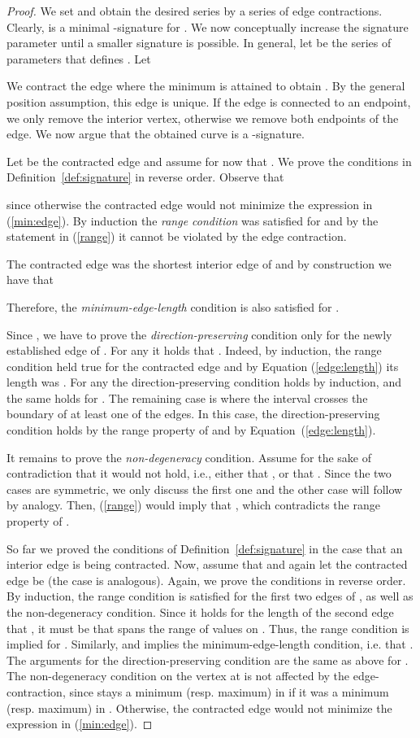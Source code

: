 \documentclass[11pt, letter]{article}
\newcommand{\defref}[1]{Definition~\ref{def:#1}}
\begin{document}
\begin{proof}
We set  and obtain the desired series by a series of edge contractions.  Clearly,  is a minimal -signature for . We now conceptually increase the signature parameter  until a smaller signature is possible. In general, let  be the series of parameters that defines . Let 

We contract the edge where the minimum is attained to obtain . By the general position assumption, this edge is unique. If the edge is connected to an endpoint, we only remove the interior vertex, otherwise we remove both endpoints of the edge. We now argue that the obtained curve  is a -signature. 

Let  be the contracted edge and assume for now that .  We prove the conditions in \defref{signature} in reverse order.  Observe that 

since otherwise the contracted edge would not minimize the expression in (\ref{min:edge}).  By induction the \emph{range condition} was satisfied for  and by the statement in (\ref{range}) it cannot be violated by the edge contraction.

The contracted edge was the shortest interior edge of  and by construction we have that

Therefore, the \emph{minimum-edge-length} condition is
also satisfied for . 

Since , we have to prove the \emph{direction-preserving} condition only for the newly established edge  of . For any  it holds that . Indeed, by induction, the range condition held true for the contracted edge and by Equation (\ref{edge:length}) its length was . For any  the direction-preserving condition holds by induction, and the same holds for . The remaining case is  where the interval   crosses the boundary of at least one of the edges. In this case, the direction-preserving condition holds by the range property of  and by Equation~(\ref{edge:length}).

It remains to prove the \emph{non-degeneracy} condition. Assume for the sake of contradiction that it would not hold, i.e., either that , or that  . Since the two cases are symmetric, we only discuss the first one and the other case will follow by analogy. Then, (\ref{range}) would imply that , which contradicts the range property of .

So far we proved the conditions of \defref{signature} in the case that an interior edge is being contracted.  Now, assume that  and again let the contracted edge be  (the case  is analogous). Again, we prove the conditions in reverse order.  By induction, the range condition is satisfied for the first two edges of , as well as the non-degeneracy condition.  Since it holds for the length of the second edge that , it must be that  spans the range of values  on . Thus, the range condition is implied for . Similarly,  and  implies the minimum-edge-length condition, i.e. that  . The arguments for the direction-preserving condition are the same as above for . The non-degeneracy condition on the vertex at  is not affected by the edge-contraction, since  stays a minimum (resp. maximum) in  if it was a minimum (resp. maximum) in . Otherwise, the contracted edge would not minimize the expression in (\ref{min:edge}).


\end{proof}
\end{document}
